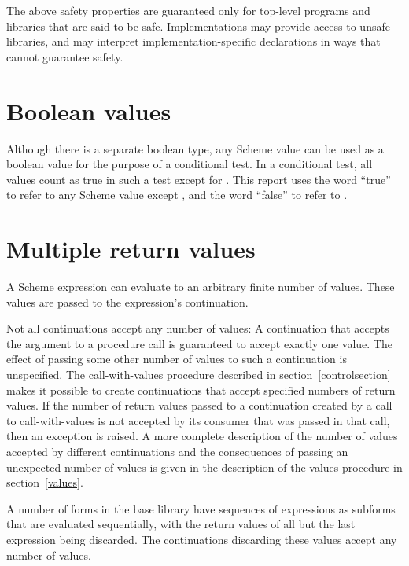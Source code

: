 The above safety properties are guaranteed only for top-level programs
and libraries that are said to be safe.  Implementations
may provide access to unsafe libraries, and may interpret
implementation-specific declarations in ways that
cannot guarantee safety.

\section{Boolean values}
\label{booleanvaluessection}

Although there is a separate boolean type, any Scheme value can be
used as a boolean value for the purpose of a conditional test.  In a
conditional test, all values count as true in such a test except for
\schfalse{}.  This report uses the word ``true'' to refer to any
Scheme value except \schfalse{}, and the word ``false'' to refer to
\schfalse{}.  

\section{Multiple return values}
\label{multiplereturnvaluessection}

A Scheme expression can evaluate to an arbitrary finite number of
values.  These values are passed to the expression's continuation.

Not all continuations accept any number of values: A continuation that
accepts the argument to a procedure call is guaranteed to accept
exactly one value.  The effect of passing some other number of values
to such a continuation is unspecified.  The {\cf call-with-values}
procedure
described in section~\ref{controlsection} makes it possible to create
continuations that accept specified numbers of return values.
If the number of
return values passed to a continuation created by a call to
{\cf call-with-values} is not accepted by its consumer
that was passed in that call, then an exception is raised.
A more complete description of the number of values accepted by
different continuations and the consequences of passing an unexpected
number of values is given in the description of the {\cf values}
procedure in section~\ref{values}.

A number of forms in the base library have sequences of expressions
as subforms that are evaluated sequentially, with the return values of
all but the last expression being discarded.  The continuations
discarding these values accept any number of values.

